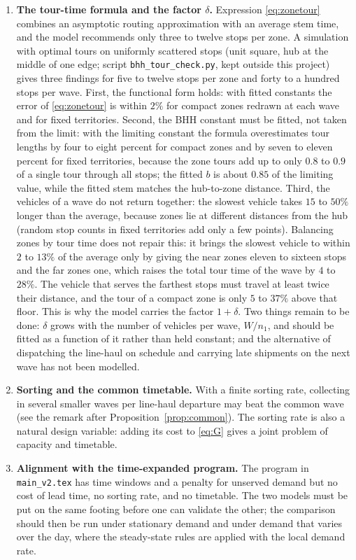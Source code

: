 \documentclass[10pt, reqno]{amsart}
\theoremstyle{definition}
\begin{document}
\begin{enumerate}
\item \textbf{The tour-time formula and the factor $\delta$.} Expression \eqref{eq:zonetour} combines an asymptotic routing approximation with an average stem time, and the model recommends only three to twelve stops per zone. A simulation with optimal tours on uniformly scattered stops (unit square, hub at the middle of one edge; script \texttt{bhh\_tour\_check.py}, kept outside this project) gives three findings for five to twelve stops per zone and forty to a hundred stops per wave. First, the functional form holds: with fitted constants the error of \eqref{eq:zonetour} is within $2\%$ for compact zones redrawn at each wave and for fixed territories. Second, the BHH constant must be fitted, not taken from the limit: with the limiting constant the formula overestimates tour lengths by four to eight percent for compact zones and by seven to eleven percent for fixed territories, because the zone tours add up to only $0.8$ to $0.9$ of a single tour through all stops; the fitted $b$ is about $0.85$ of the limiting value, while the fitted stem matches the hub-to-zone distance. Third, the vehicles of a wave do not return together: the slowest vehicle takes $15$ to $50\%$ longer than the average, because zones lie at different distances from the hub (random stop counts in fixed territories add only a few points). Balancing zones by tour time does not repair this: it brings the slowest vehicle to within $2$ to $13\%$ of the average only by giving the near zones eleven to sixteen stops and the far zones one, which raises the total tour time of the wave by $4$ to $28\%$. The vehicle that serves the farthest stops must travel at least twice their distance, and the tour of a compact zone is only $5$ to $37\%$ above that floor. This is why the model carries the factor $1+\delta$. Two things remain to be done: $\delta$ grows with the number of vehicles per wave, $W/n_1$, and should be fitted as a function of it rather than held constant; and the alternative of dispatching the line-haul on schedule and carrying late shipments on the next wave has not been modelled.
\item \textbf{Sorting and the common timetable.} With a finite sorting rate, collecting in several smaller waves per line-haul departure may beat the common wave (see the remark after Proposition~\ref{prop:common}). The sorting rate is also a natural design variable: adding its cost to \eqref{eq:G} gives a joint problem of capacity and timetable.
\item \textbf{Alignment with the time-expanded program.} The program in \texttt{main\_v2.tex} has time windows and a penalty for unserved demand but no cost of lead time, no sorting rate, and no timetable. The two models must be put on the same footing before one can validate the other; the comparison should then be run under stationary demand and under demand that varies over the day, where the steady-state rules are applied with the local demand rate.

\end{enumerate}
\end{document}
